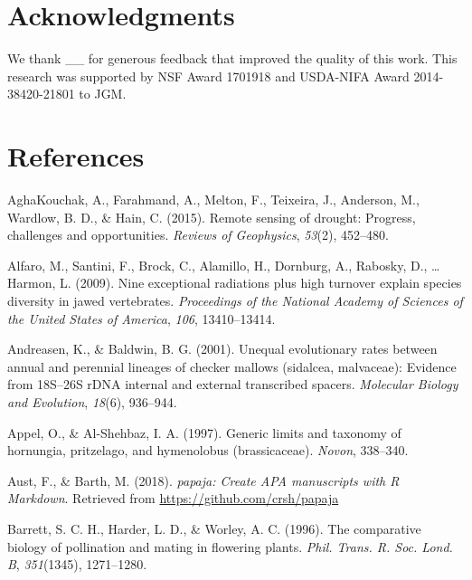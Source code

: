 \documentclass[man,floatsintext]{apa6}
\theoremstyle{definition}
\theoremstyle{definition}
\theoremstyle{definition}
\theoremstyle{remark}
\begin{document}
\hypertarget{acknowledgments}{%
\section{Acknowledgments}\label{acknowledgments}}

We thank \_\_ for generous feedback that improved the quality of this
work. This research was supported by NSF Award 1701918 and USDA-NIFA
Award 2014-38420-21801 to JGM.

\hypertarget{references}{%
\section{References}\label{references}}

\newpage

\begingroup
\setlength{\parindent}{-0.5in}
\setlength{\leftskip}{0.5in}

\hypertarget{refs}{}
\leavevmode\hypertarget{ref-aghakouchak2015remote}{}%
AghaKouchak, A., Farahmand, A., Melton, F., Teixeira, J., Anderson, M.,
Wardlow, B. D., \& Hain, C. (2015). Remote sensing of drought: Progress,
challenges and opportunities. \emph{Reviews of Geophysics},
\emph{53}(2), 452--480.

\leavevmode\hypertarget{ref-R-geiger_a}{}%
Alfaro, M., Santini, F., Brock, C., Alamillo, H., Dornburg, A., Rabosky,
D., \ldots{} Harmon, L. (2009). Nine exceptional radiations plus high
turnover explain species diversity in jawed vertebrates.
\emph{Proceedings of the National Academy of Sciences of the United
States of America}, \emph{106}, 13410--13414.

\leavevmode\hypertarget{ref-andreasen2001unequal}{}%
Andreasen, K., \& Baldwin, B. G. (2001). Unequal evolutionary rates
between annual and perennial lineages of checker mallows (sidalcea,
malvaceae): Evidence from 18S--26S rDNA internal and external
transcribed spacers. \emph{Molecular Biology and Evolution},
\emph{18}(6), 936--944.

\leavevmode\hypertarget{ref-appel1997generic}{}%
Appel, O., \& Al-Shehbaz, I. A. (1997). Generic limits and taxonomy of
hornungia, pritzelago, and hymenolobus (brassicaceae). \emph{Novon},
338--340.

\leavevmode\hypertarget{ref-R-papaja}{}%
Aust, F., \& Barth, M. (2018). \emph{papaja: Create APA manuscripts with
R Markdown}. Retrieved from \url{https://github.com/crsh/papaja}

\leavevmode\hypertarget{ref-barrett1996comparative}{}%
Barrett, S. C. H., Harder, L. D., \& Worley, A. C. (1996). The
comparative biology of pollination and mating in flowering plants.
\emph{Phil. Trans. R. Soc. Lond. B}, \emph{351}(1345), 1271--1280.
\end{document}
